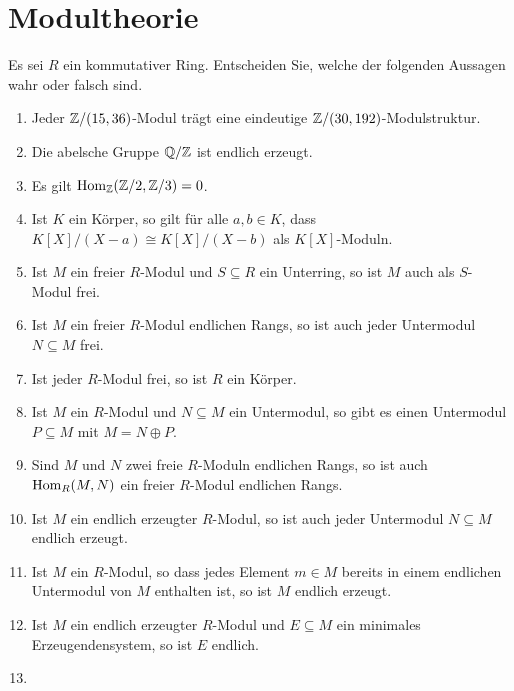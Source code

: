 \section{Modultheorie}




\begin{question}[subtitle = Wahr oder Falsch?]
  Es sei $R$ ein kommutativer Ring.
  Entscheiden Sie, welche der folgenden Aussagen wahr oder falsch sind.
  \begin{enumerate}
    \item
      Jeder $\mathbb{Z}/(15,36)$-Modul trägt eine eindeutige $\mathbb{Z}/(30,192)$-Modulstruktur.
    \item
      Die abelsche Gruppe $\mathbb{Q}/\mathbb{Z}$ ist endlich erzeugt.
    \item
      Es gilt $\operatorname{Hom}_{\mathbb{Z}}(\mathbb{Z}/2, \mathbb{Z}/3) = 0$.
    \item
      Ist $K$ ein Körper, so gilt für alle $a, b \in K$, dass $K[X]/(X-a) \cong K[X]/(X-b)$ als $K[X]$-Moduln.
    \item
      Ist $M$ ein freier $R$-Modul und $S \subseteq R$ ein Unterring, so ist $M$ auch als $S$-Modul frei.
    \item
      Ist $M$ ein freier $R$-Modul endlichen Rangs, so ist auch jeder Untermodul $N \subseteq M$ frei.
    \item
      Ist jeder $R$-Modul frei, so ist $R$ ein Körper.
    \item
      Ist $M$ ein $R$-Modul und $N \subseteq M$ ein Untermodul, so gibt es einen Untermodul $P \subseteq M$ mit $M = N \oplus P$.
    \item
      Sind $M$ und $N$ zwei freie $R$-Moduln endlichen Rangs, so ist auch $\operatorname{Hom}_R(M, N)$ ein freier $R$-Modul endlichen Rangs.
    \item
      Ist $M$ ein endlich erzeugter $R$-Modul, so ist auch jeder Untermodul $N \subseteq M$ endlich erzeugt.
    \item
      Ist $M$ ein $R$-Modul, so dass jedes Element $m \in M$ bereits in einem endlichen Untermodul von $M$ enthalten ist, so ist $M$ endlich erzeugt.
    \item
      Ist $M$ ein endlich erzeugter $R$-Modul und $E \subseteq M$ ein minimales Erzeugendensystem, so ist $E$ endlich.
    \item

\end{enumerate}
\end{question}
